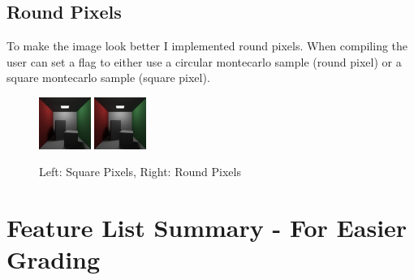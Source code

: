 \documentclass{article}
\begin{document}
    \subsection{Round Pixels}
    To make the image look better I implemented round pixels. When compiling the user can set a flag to either use a circular montecarlo sample (round pixel) or a square montecarlo sample (square pixel). \par

    \begin{figure}[H]
        \centering
        \includegraphics[width=0.15\textwidth]{samples/SquarePixels.png}
        \includegraphics[width=0.15\textwidth]{samples/CornellRoundPixels.png}
        \caption{Left: Square Pixels, Right: Round Pixels}
    \end{figure}


\section{Feature List Summary - For Easier Grading}
\end{document}
